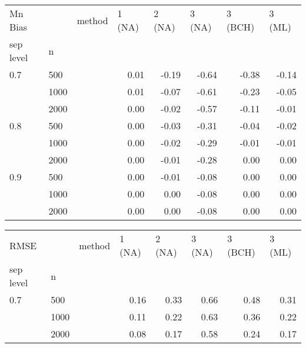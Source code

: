 \documentclass{article}
\begin{document}
\begin{table}[ht]
\centering
\begin{tabular}{lll |rrrrr}
  \hline
Mn Bias   &      & method & \multicolumn{1}{l}{ 1 (NA)} & \multicolumn{1}{l}{ 2 (NA)} & \multicolumn{1}{l}{ 3 (NA)} & \multicolumn{1}{l}{ 3 (BCH)} & \multicolumn{1}{l}{ 3 (ML)} \\ 
  sep level & n    &        & \multicolumn{1}{l}{       } & \multicolumn{1}{l}{       } & \multicolumn{1}{l}{       } & \multicolumn{1}{l}{        } & \multicolumn{1}{l}{       } \\ 
   \hline
0.7       & 500  &        &   0.01 &  -0.19 &  -0.64 &   -0.38 &  -0.14 \\ 
            & 1000 &        &   0.01 &  -0.07 &  -0.61 &   -0.23 &  -0.05 \\ 
            & 2000 &        &   0.00 &  -0.02 &  -0.57 &   -0.11 &  -0.01 \\ 
  0.8       & 500  &        &   0.00 &  -0.03 &  -0.31 &   -0.04 &  -0.02 \\ 
            & 1000 &        &   0.00 &  -0.02 &  -0.29 &   -0.01 &  -0.01 \\ 
            & 2000 &        &   0.00 &  -0.01 &  -0.28 &    0.00 &   0.00 \\ 
  0.9       & 500  &        &   0.00 &  -0.01 &  -0.08 &    0.00 &   0.00 \\ 
            & 1000 &        &   0.00 &   0.00 &  -0.08 &    0.00 &   0.00 \\ 
            & 2000 &        &   0.00 &   0.00 &  -0.08 &    0.00 &   0.00 \\ 
   \hline
\end{tabular}
\begin{tabular}{lll |rrrrr}
  \hline
RMSE         &      & method & \multicolumn{1}{l}{ 1 (NA)} & \multicolumn{1}{l}{ 2 (NA)} & \multicolumn{1}{l}{ 3 (NA)} & \multicolumn{1}{l}{ 3 (BCH)} & \multicolumn{1}{l}{ 3 (ML)} \\ 
  sep level & n    &        & \multicolumn{1}{l}{       } & \multicolumn{1}{l}{       } & \multicolumn{1}{l}{       } & \multicolumn{1}{l}{        } & \multicolumn{1}{l}{       } \\ 
   \hline
0.7       & 500  &        &   0.16 &   0.33 &   0.66 &    0.48 &   0.31 \\ 
            & 1000 &        &   0.11 &   0.22 &   0.63 &    0.36 &   0.22 \\ 
            & 2000 &        &   0.08 &   0.17 &   0.58 &    0.24 &   0.17 \\ 

\end{tabular}
\end{table}
\end{document}
